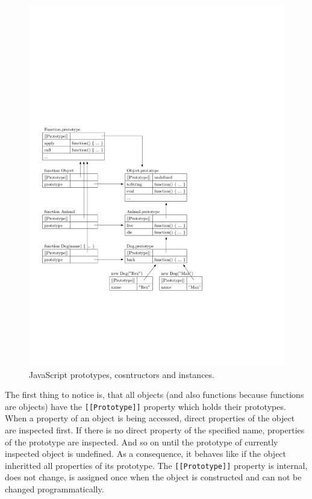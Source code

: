 \documentclass[12pt,a4paper]{report}
\begin{document}
\begin{figure}[ht]
  \centering
	\includegraphics{img/JavaScriptPrototypes.pdf}
	\caption{JavaScript prototypes, cosntructors and instances.}
	\label{JavaScriptInheritance}
\end{figure}

The first thing to notice is, that all objects (and also functions because functions are objects) have the \texttt{[[Prototype]]} property which holds their prototypes. When a property of an object is being accessed, direct properties of the object are inspected first. If there is no direct property of the specified name, properties of the prototype are inspected. And so on until the prototype of currently inspected object is undefined. As a consequence, it behaves like if the object inheritted all properties of its prototype. The \texttt{[[Prototype]]} property is internal, does not change, is assigned once when the object is constructed and can not be changed programmatically.
\end{document}
